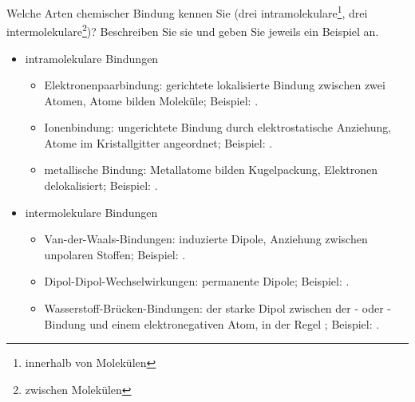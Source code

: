 \documentclass[DIV11]{scrartcl}
\begin{document}
\begin{question}[name=Bindungen II]
Welche Arten chemischer Bindung kennen Sie (drei
intramolekulare\footnote{innerhalb von Molekülen}, drei
intermolekulare\footnote{zwischen Molekülen})?  Beschreiben Sie sie und geben
Sie jeweils ein Beispiel an.
\end{question}
\begin{solution}[name=Bindungen II]
\begin{itemize}
  \item intramolekulare Bindungen
    \begin{itemize}
      \item Elektronenpaarbindung: gerichtete lokalisierte Bindung zwischen
        zwei Atomen, Atome bilden Moleküle; Beispiel: .
      \item Ionenbindung: ungerichtete Bindung durch elektrostatische
        Anziehung, Atome im Kristallgitter angeordnet; Beispiel: .
      \item metallische Bindung: Metallatome bilden Kugelpackung, Elektronen
        delokalisiert; Beispiel: .
    \end{itemize}
  \item intermolekulare Bindungen
    \begin{itemize}
      \item Van-der-Waals-Bindungen: induzierte Dipole, Anziehung zwischen
        unpolaren Stoffen; Beispiel: .
      \item Dipol-Dipol-Wechselwirkungen: permanente Dipole; Beispiel:
        .
      \item Wasserstoff-Brücken-Bindungen: der starke Dipol zwischen der
        - oder -Bindung und einem elektronegativen Atom,
        in der Regel ; Beispiel: .
     \end{itemize}
\end{itemize}
\end{solution}
\end{document}
